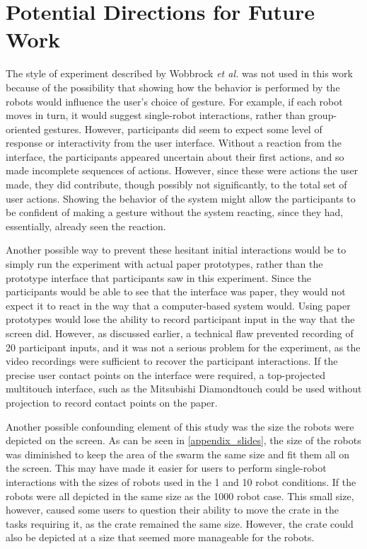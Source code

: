 \chapter{Potential Directions for Future Work} \label{chapter:Future_work}
\thispagestyle{fancy}

The style of experiment described by Wobbrock \emph{et al.} was not used in this work because of the possibility that showing how the behavior is performed by the robots would influence the user's choice of gesture. 
For example, if each robot moves in turn, it would suggest single-robot interactions, rather than group-oriented gestures. 
However, participants did seem to expect some level of response or interactivity from the user interface. 
Without a reaction from the interface, the participants appeared uncertain about their first actions, and so made incomplete sequences of actions. 
However, since these were actions the user made, they did contribute, though possibly not significantly, to the total set of user actions.
Showing the behavior of the system might allow the participants to be confident of making a gesture without the system reacting, since they had, essentially, already seen the reaction. 

Another possible way to prevent these hesitant initial interactions would be to simply run the experiment with actual paper prototypes, rather than the prototype interface that participants saw in this experiment. 
Since the participants would be able to see that the interface was paper, they would not expect it to react in the way that a computer-based system would. 
Using paper prototypes would lose the ability to record participant input in the way that the screen did. 
However, as discussed earlier, a technical flaw prevented recording of 20 participant inputs, and it was not a serious problem for the experiment, as the video recordings were sufficient to recover the participant interactions. 
If the precise user contact points on the interface were required, a top-projected multitouch interface, such as the Mitsubishi Diamondtouch could be used without projection to record contact points on the paper. 
	
Another possible confounding element of this study was the size the robots were depicted on the screen.
As can be seen in \ref{appendix_slides}, the size of the robots was diminished to keep the area of the swarm the same size and fit them all on the screen. 
This may have made it easier for users to perform single-robot interactions with the sizes of robots used in the 1 and 10 robot conditions. 
If the robots were all depicted in the same size as the 1000 robot case. 
This small size, however, caused some users to question their ability to move the crate in the tasks requiring it, as the crate remained the same size.
However, the crate could also be depicted at a size that seemed more manageable for the robots.  

